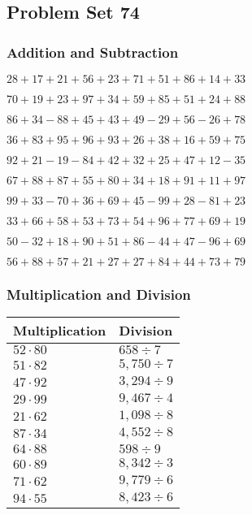 \hypertarget{problem-set-74}{%
\subsection{Problem Set 74}\label{problem-set-74}}

\hypertarget{addition-and-subtraction}{%
\subsubsection{Addition and
Subtraction}\label{addition-and-subtraction}}

\(28+17+21+56+23+71+51+86+14+33\)

\(70+19+23+97+34+59+85+51+24+88\)

\(86+34-88+45+43+49-29+56-26+78\)

\(36+83+95+96+93+26+38+16+59+75\)

\(92+21-19-84+42+32+25+47+12-35\)

\(67+88+87+55+80+34+18+91+11+97\)

\(99+33-70+36+69+45-99+28-81+23\)

\(33+66+58+53+73+54+96+77+69+19\)

\(50-32+18+90+51+86-44+47-96+69\)

\(56+88+57+21+27+27+84+44+73+79\)

\hypertarget{multiplication-and-division}{%
\subsubsection{Multiplication and
Division}\label{multiplication-and-division}}

\begin{longtable}[]{@{}ll@{}}
\toprule
Multiplication & Division\tabularnewline
\midrule
\endhead
\(52\cdot80\) & \(658÷7\)\tabularnewline
\(51\cdot82\) & \(5,750÷7\)\tabularnewline
\(47\cdot92\) & \(3,294÷9\)\tabularnewline
\(29\cdot99\) & \(9,467÷4\)\tabularnewline
\(21\cdot62\) & \(1,098÷8\)\tabularnewline
\(87\cdot34\) & \(4,552÷8\)\tabularnewline
\(64\cdot88\) & \(598÷9\)\tabularnewline
\(60\cdot89\) & \(8,342÷3\)\tabularnewline
\(71\cdot62\) & \(9,779÷6\)\tabularnewline
\(94\cdot55\) & \(8,423÷6\)\tabularnewline
\bottomrule
\end{longtable}
